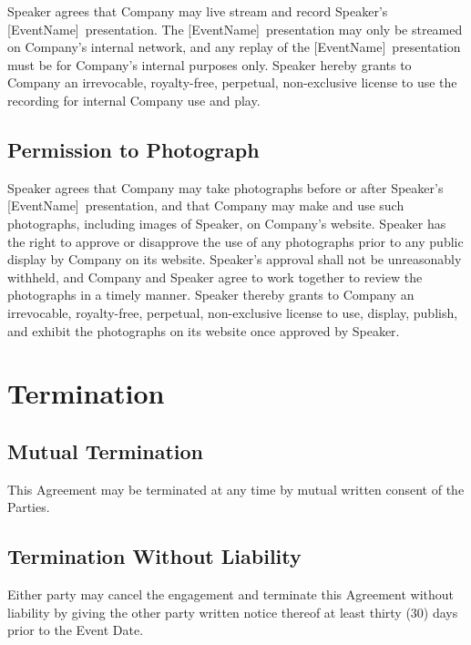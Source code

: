 \documentclass[a4paper,12pt]{article} %
\newcommand{\EventName}{[EventName]}
\begin{document}
Speaker agrees that Company may live stream and record Speaker's \EventName ~presentation. The \EventName ~presentation may only be streamed on Company's internal network, and any replay of the \EventName ~presentation must be for Company's internal purposes only. Speaker hereby grants to Company an irrevocable, royalty-free, perpetual, non-exclusive license to use the recording for internal Company use and play.

\subsection{Permission to Photograph}

Speaker agrees that Company may take photographs before or after Speaker's \EventName ~presentation, and that Company may make and use such photographs, including images of Speaker, on Company's website. Speaker has the right to approve or disapprove the use of any photographs prior to any public display by Company on its website. Speaker's approval shall not be unreasonably withheld, and Company and Speaker agree to work together to review the photographs in a timely manner. Speaker thereby grants to Company an irrevocable, royalty-free, perpetual, non-exclusive license to use, display, publish, and exhibit the photographs on its website once approved by Speaker.


\section{Termination}

\subsection{Mutual Termination}

This Agreement may be terminated at any time by mutual written consent of the Parties.

\subsection{Termination Without Liability}

Either party may cancel the engagement and terminate this Agreement without liability by giving the other party written notice thereof at least thirty (30) days prior to the Event Date.
\end{document}
